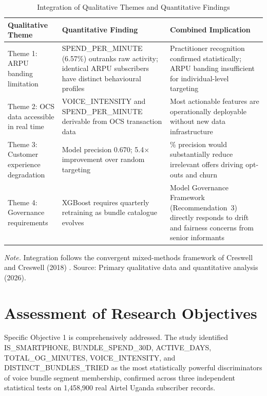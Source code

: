 \begin{table}[H]
\centering
\caption{Integration of Qualitative Themes and Quantitative Findings}
\label{tab:integration}
\small
\renewcommand{\arraystretch}{1.4}
\begin{tabularx}{\textwidth}{
  >{\raggedright\arraybackslash}p{3.5cm}
  >{\raggedright\arraybackslash}p{4.5cm}
  >{\raggedright\arraybackslash}X
}
\toprule
\textbf{Qualitative Theme} & \textbf{Quantitative Finding} & \textbf{Combined Implication} \\
\midrule
Theme 1: ARPU banding limitation &
SPEND\_PER\_MINUTE (6.57\%) outranks raw activity; identical ARPU subscribers
have distinct behavioural profiles &
Practitioner recognition confirmed statistically; ARPU banding insufficient for
individual-level targeting \\
\addlinespace[4pt]
Theme 2: OCS data accessible in real time &
VOICE\_INTENSITY and SPEND\_PER\_MINUTE derivable from OCS transaction data &
Most actionable features are operationally deployable without new data
infrastructure \\
\addlinespace[4pt]
Theme 3: Customer experience degradation &
Model precision 0.670; 5.4$\times$ improvement over random targeting &
67\% precision would substantially reduce irrelevant offers driving opt-outs
and churn \\
\addlinespace[4pt]
Theme 4: Governance requirements &
XGBoost requires quarterly retraining as bundle catalogue evolves &
Model Governance Framework (Recommendation~3) directly responds to drift and
fairness concerns from senior informants \\
\bottomrule
\end{tabularx}
\begin{flushleft}
\small\textit{Note.} Integration follows the convergent mixed-methods framework
of Creswell and Creswell (2018) \cite{ref17}. Source: Primary qualitative data
and quantitative analysis (2026).
\end{flushleft}
\end{table}

\section{Assessment of Research Objectives}

Specific Objective 1 is comprehensively addressed. The study identified IS\_SMARTPHONE, BUNDLE\_SPEND\_30D, ACTIVE\_DAYS, TOTAL\_OG\_MINUTES, VOICE\_INTENSITY, and DISTINCT\_BUNDLES\_TRIED as the most statistically powerful discriminators of voice bundle segment membership, confirmed across three independent statistical tests on 1,458,900 real Airtel Uganda subscriber records.

